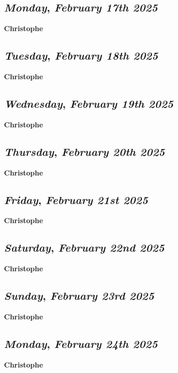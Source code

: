 \def\day{\textit{February 17th 2025}}
\def\weekday{\textit{Monday}}
\subsection*{\weekday, \day}
\textbf {Christophe}

\def\day{\textit{February 18th 2025}}
\def\weekday{\textit{Tuesday}}
\subsection*{\weekday, \day}
\textbf {Christophe}

\def\day{\textit{February 19th 2025}}
\def\weekday{\textit{Wednesday}}
\subsection*{\weekday, \day}
\textbf {Christophe}

\def\day{\textit{February 20th 2025}}
\def\weekday{\textit{Thursday}}
\subsection*{\weekday, \day}
\textbf {Christophe}

\def\day{\textit{February 21st 2025}}
\def\weekday{\textit{Friday}}
\subsection*{\weekday, \day}
\textbf {Christophe}

\def\day{\textit{February 22nd 2025}}
\def\weekday{\textit{Saturday}}
\subsection*{\weekday, \day}
\textbf {Christophe}

\def\day{\textit{February 23rd 2025}}
\def\weekday{\textit{Sunday}}
\subsection*{\weekday, \day}
\textbf {Christophe}

\def\day{\textit{February 24th 2025}}
\def\weekday{\textit{Monday}}
\subsection*{\weekday, \day}
\textbf {Christophe}

\def\day{\textit{February 25th 2025}}
\def\weekday{\textit{Tuesday}}
